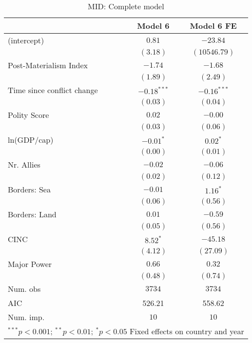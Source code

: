 
\begin{table}
\begin{center}
\begin{tabular}{l c c}
\toprule
 & Model 6 & Model 6 FE \\
\midrule
(intercept)                & $0.81$        & $-23.84$      \\
                           & $(3.18)$      & $(10546.79)$  \\
Post-Materialism Index     & $-1.74$       & $-1.68$       \\
                           & $(1.89)$      & $(2.49)$      \\
Time since conflict change & $-0.18^{***}$ & $-0.16^{***}$ \\
                           & $(0.03)$      & $(0.04)$      \\
Polity Score               & $0.02$        & $-0.00$       \\
                           & $(0.03)$      & $(0.06)$      \\
ln(GDP/cap)                & $-0.01^{*}$   & $0.02^{*}$    \\
                           & $(0.00)$      & $(0.01)$      \\
Nr. Allies                 & $-0.02$       & $-0.06$       \\
                           & $(0.02)$      & $(0.12)$      \\
Borders: Sea               & $-0.01$       & $1.16^{*}$    \\
                           & $(0.06)$      & $(0.56)$      \\
Borders: Land              & $0.01$        & $-0.59$       \\
                           & $(0.05)$      & $(0.56)$      \\
CINC                       & $8.52^{*}$    & $-45.18$      \\
                           & $(4.12)$      & $(27.09)$     \\
Major Power                & $0.66$        & $0.32$        \\
                           & $(0.48)$      & $(0.74)$      \\
\midrule
Num. obs                   & $3734$        & $3734$        \\
AIC                        & 526.21        & 558.62        \\
Num. imp.                  & $10$          & $10$          \\
\bottomrule
\multicolumn{3}{l}{\scriptsize{$^{***}p<0.001$; $^{**}p<0.01$; $^{*}p<0.05$ 
 Fixed effects on country and year}}
\end{tabular}
\caption{MID: Complete model}
\label{MID_3_PM}
\end{center}
\end{table}
